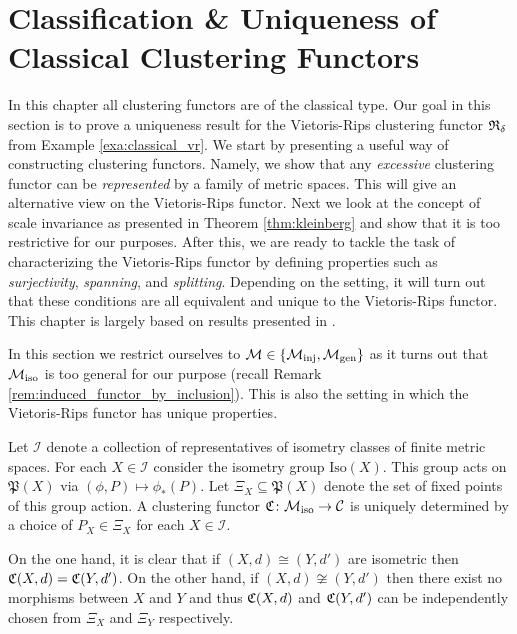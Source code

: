 \chapter{Classification \& Uniqueness of Classical Clustering Functors}
\label{chapter__classical}
In this chapter all clustering functors are of the classical type.
Our goal in this section is to prove a uniqueness result for the Vietoris-Rips clustering functor $\mathfrak{R}_\delta$ from Example \ref{exa:classical_vr}.
%
We start by presenting a useful way of constructing clustering functors. Namely, we show that any \emph{excessive} clustering functor can be \emph{represented} by a family of metric spaces. This will give an alternative view on the Vietoris-Rips functor.
%
Next we look at the concept of scale invariance as presented in Theorem \ref{thm:kleinberg} and show that it is too restrictive for our purposes.
%
After this, we are ready to tackle the task of characterizing the Vietoris-Rips functor by defining properties such as \emph{surjectivity}, \emph{spanning}, and \emph{splitting}. Depending on the setting, it will turn out that these conditions are all equivalent and unique to the Vietoris-Rips functor.
%
This chapter is largely based on results presented in \cite{Carlsson2010}.

In this section we restrict ourselves to $\mathcal{M} \in \{{\mathcal{M}_\mathrm{inj}}, {\mathcal{M}_\mathrm{gen}}\}$ as it turns out that ${\mathcal{M}_\mathrm{iso}}$ is too general for our purpose (recall Remark \ref{rem:induced_functor_by_inclusion}).
This is also the setting in which the Vietoris-Rips functor has unique properties.

\begin{myremark}{\cite[Thm.~6.1]{Carlsson2010}}{}
Let $\mathcal{I}$ denote a collection of representatives of isometry classes of finite metric spaces.
For each $X \in \mathcal{I}$ consider the isometry group $\mathrm{Iso}(X)$.
This group acts on $\mathfrak{P}(X)$ via $(\phi, P) \mapsto \phi_*(P)$.
Let $\Xi_X \subseteq \mathfrak{P}(X)$ denote the set of fixed points of this group action.
A clustering functor $\mathfrak{C}\colon {\mathcal{M}_\mathrm{iso}} \to \mathcal{C}$ is uniquely determined by a choice of $P_X \in \Xi_X$ for each $X \in \mathcal{I}$.

\medskip
On the one hand, it is clear that if $(X,d) \cong (Y,d')$ are isometric then ${\mathfrak{C}(X,d) = \mathfrak{C}(Y,d')}$. On the other hand, if $(X,d) \not\cong (Y,d')$ then there exist no morphisms between $X$ and $Y$ and thus $\mathfrak{C}(X,d)$ and $\mathfrak{C}(Y,d')$ can be independently chosen from $\Xi_X$ and $\Xi_Y$ respectively.
\end{myremark}


